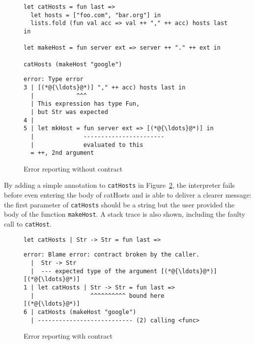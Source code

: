 \documentclass[sigplan,10pt,review,anonymous]{acmart}
\newcommand{\nickel}[1]{\lstinline[language=nickel]{#1}}
\begin{document}
\begin{figure}[h]
  \begin{center}
\begin{lstlisting}[language=nickel,title={Source program}]
let catHosts = fun last =>
  let hosts = ["foo.com", "bar.org"] in
  lists.fold (fun val acc => val ++ "," ++ acc) hosts last in

let makeHost = fun server ext => server ++ "." ++ ext in

catHosts (makeHost "google")
\end{lstlisting}

\begin{lstlisting}[title={Error message},frame=none,numbers=none]
error: Type error
3 | [(*@{\ldots}@*)] "," ++ acc) hosts last in
  |            ^^^
  | This expression has type Fun,
  | but Str was expected
4 |
5 | let mkHost = fun server ext => [(*@{\ldots}@*)] in
  |              -----------------------
  |              evaluated to this
  = ++, 2nd argument
\end{lstlisting}
  \end{center}
\caption{Error reporting without contract}
\label{fig:contract-reporting-wo}
\end{figure}

By adding a simple annotation to \nickel{catHosts} in
Figure~\ref{fig:contract-reporting-w}, the interpreter fails before even
entering the body of catHosts and is able to deliver a clearer message: the
first parameter of \nickel{catHosts} should be a string but the user provided
the body of the function \nickel{makeHost}. A stack trace is also shown,
including the faulty call to \nickel{catHost}.

\begin{figure}[h]
  \begin{center}
\begin{lstlisting}[language=nickel,title={Added contract}]
let catHosts | Str -> Str = fun last =>
\end{lstlisting}

\begin{lstlisting}[title={Error message with contract},frame=none,numbers=none, basicstyle=\footnotesize\ttfamily]
error: Blame error: contract broken by the caller.
  |  Str -> Str
  |  --- expected type of the argument [(*@{\ldots}@*)]
[(*@{\ldots}@*)]
1 | let catHosts | Str -> Str = fun last =>
  |                ^^^^^^^^^^ bound here
[(*@{\ldots}@*)]
6 | catHosts (makeHost "google")
  | --------------------------- (2) calling <func>
\end{lstlisting}
  \end{center}
\caption{Error reporting with contract}
\label{fig:contract-reporting-w}
\end{figure}
\end{document}
